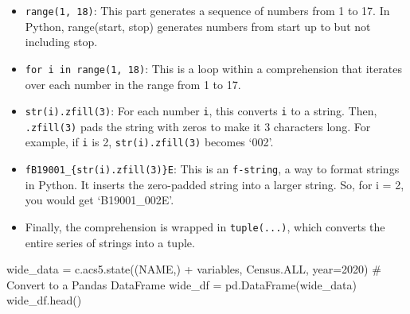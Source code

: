 \documentclass[
  letterpaper,
  DIV=11,
  numbers=noendperiod]{scrreprt}
\newenvironment{Shaded}{\begin{snugshade}}{\end{snugshade}}
\newcommand{\CommentTok}[1]{\textcolor[rgb]{0.37,0.37,0.37}{#1}}
\newcommand{\DecValTok}[1]{\textcolor[rgb]{0.68,0.00,0.00}{#1}}
\newcommand{\NormalTok}[1]{\textcolor[rgb]{0.00,0.23,0.31}{#1}}
\newcommand{\OperatorTok}[1]{\textcolor[rgb]{0.37,0.37,0.37}{#1}}
\newcommand{\StringTok}[1]{\textcolor[rgb]{0.13,0.47,0.30}{#1}}
\providecommand{\tightlist}{%
  \setlength{\itemsep}{0pt}\setlength{\parskip}{0pt}}\usepackage{longtable,booktabs,array}
\begin{document}
\begin{itemize}
\tightlist
\item
  \texttt{range(1,\ 18)}: This part generates a sequence of numbers from
  1 to 17. In Python, range(start, stop) generates numbers from start up
  to but not including stop.
\item
  \texttt{for\ i\ in\ range(1,\ 18)}: This is a loop within a
  comprehension that iterates over each number in the range from 1 to
  17.
\item
  \texttt{str(i).zfill(3)}: For each number \texttt{i}, this converts
  \texttt{i} to a string. Then, \texttt{.zfill(3)} pads the string with
  zeros to make it 3 characters long. For example, if \texttt{i} is 2,
  \texttt{str(i).zfill(3)} becomes `002'.
\item
  \texttt{f\textquotesingle{}B19001\_\{str(i).zfill(3)\}E\textquotesingle{}}:
  This is an \texttt{f-string}, a way to format strings in Python. It
  inserts the zero-padded string into a larger string. So, for i = 2,
  you would get `B19001\_002E'.
\item
  Finally, the comprehension is wrapped in \texttt{tuple(...)}, which
  converts the entire series of strings into a tuple.
\end{itemize}

\begin{Shaded}
\begin{Highlighting}[]
\NormalTok{wide\_data }\OperatorTok{=}\NormalTok{ c.acs5.state((}\StringTok{\textquotesingle{}NAME\textquotesingle{}}\NormalTok{,) }\OperatorTok{+}\NormalTok{ variables, Census.ALL, year}\OperatorTok{=}\DecValTok{2020}\NormalTok{)}
\CommentTok{\# Convert to a Pandas DataFrame}
\NormalTok{wide\_df }\OperatorTok{=}\NormalTok{ pd.DataFrame(wide\_data)}
\NormalTok{wide\_df.head()}
\end{Highlighting}
\end{Shaded}
\end{document}

